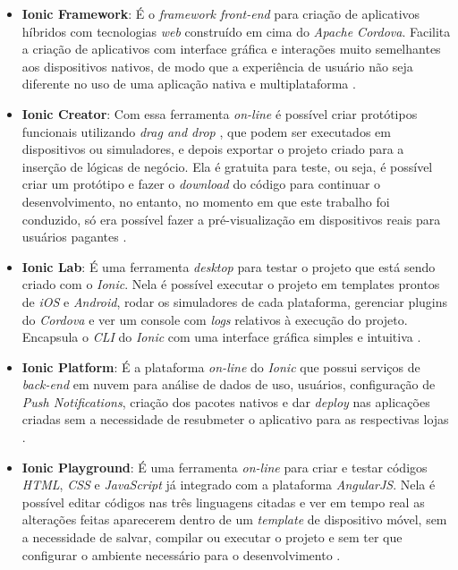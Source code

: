 \begin{itemize}

    \item \textbf{Ionic Framework}: É o \textit{framework front-end} para criação de aplicativos híbridos com tecnologias \textit{web} construído em cima
    do \textit{Apache Cordova}. Facilita a criação de aplicativos com interface gráfica e interações muito semelhantes aos dispositivos nativos, de modo que 
    a experiência de usuário não seja diferente no uso de uma aplicação nativa e multiplataforma \cite{drifty_ionic:_2016}. 
    
    \item \textbf{Ionic Creator}: Com essa ferramenta \textit{on-line} é possível criar protótipos funcionais utilizando \textit{drag and drop}
    , que podem ser executados em dispositivos ou simuladores, e depois exportar o projeto criado para a 
    inserção de lógicas de negócio. Ela é gratuita para teste, ou seja, é possível criar um protótipo e fazer o \textit{download}
    do código para continuar o desenvolvimento, no entanto, no momento em que este trabalho foi conduzido, só era possível
    fazer a pré-visualização em dispositivos reais para usuários pagantes \cite{drifty_ionic_2016-1}.
    
    \item \textbf{Ionic Lab}: É uma ferramenta \textit{desktop} para testar o projeto que está sendo criado com o \textit{Ionic}. Nela é possível
    executar o projeto em templates prontos de \textit{iOS} e \textit{Android}, rodar os simuladores de cada plataforma,
    gerenciar plugins do \textit{Cordova} e ver um console com \textit{logs} relativos à execução do projeto. Encapsula o \textit{CLI} do \textit{Ionic} com uma interface gráfica simples
    e intuitiva \cite{drifty_ionic_2016-2}.
    
    \item \textbf{Ionic Platform}: É a plataforma \textit{on-line} do \textit{Ionic} que possui serviços de \textit{back-end} em nuvem para análise de dados de uso,
     usuários, configuração de \textit{Push Notifications}, criação dos pacotes nativos e dar \textit{deploy} nas aplicações criadas sem a necessidade de
     resubmeter o aplicativo para as respectivas lojas \cite{drifty_ionic_2016-3}.
     
    \item \textbf{Ionic Playground}: É uma ferramenta \textit{on-line} para criar e testar códigos \textit{HTML}, \textit{CSS} e \textit{JavaScript} 
    já integrado com a plataforma \textit{AngularJS}. Nela é possível editar códigos nas três linguagens citadas e ver em tempo real as alterações 
    feitas aparecerem dentro de um \textit{template} de dispositivo móvel, sem a necessidade de salvar, compilar ou executar o projeto e sem ter que 
    configurar o ambiente necessário para o desenvolvimento \cite{drifty_ionic_2016-4}. 
    

\end{itemize}
